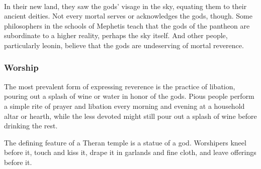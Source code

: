 \pagebreak~
\vspace{14.5cm}

In their new land, they saw the gods' visage in the sky, equating them to their ancient deities.
Not every mortal serves or acknowledges the gods, though.
Some philosophers in the schools of Mephetis teach that the gods of the pantheon are subordinate to a higher reality, perhaps the sky itself.
And other people, particularly leonin, believe that the gods are undeserving of mortal reverence.

\subsubsection{Worship}
    The most prevalent form of expressing reverence is the practice of libation, pouring out a splash of wine or water in honor of the gods.
    Pious people perform a simple rite of prayer and libation every morning and evening at a household altar or hearth, while the less devoted might still pour out a splash of wine before drinking the rest.

    The defining feature of a Theran temple is a statue of a god.
    Worshipers kneel before it, touch and kiss it, drape it in garlands and fine cloth, and leave offerings before it.



\pagebreak








